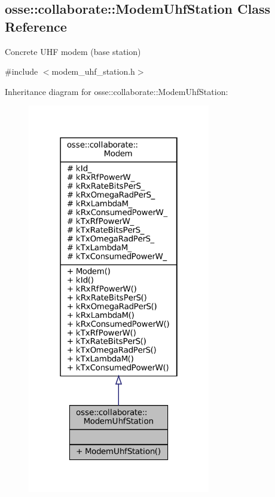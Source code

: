 \hypertarget{classosse_1_1collaborate_1_1_modem_uhf_station}{}\subsection{osse\+:\+:collaborate\+:\+:Modem\+Uhf\+Station Class Reference}
\label{classosse_1_1collaborate_1_1_modem_uhf_station}


Concrete U\+HF modem (base station)  




{\ttfamily \#include $<$modem\+\_\+uhf\+\_\+station.\+h$>$}



Inheritance diagram for osse\+:\+:collaborate\+:\+:Modem\+Uhf\+Station\+:
\nopagebreak
\begin{figure}[H]
\begin{center}
\leavevmode
\includegraphics[width=226pt]{classosse_1_1collaborate_1_1_modem_uhf_station__inherit__graph}
\end{center}
\end{figure}
